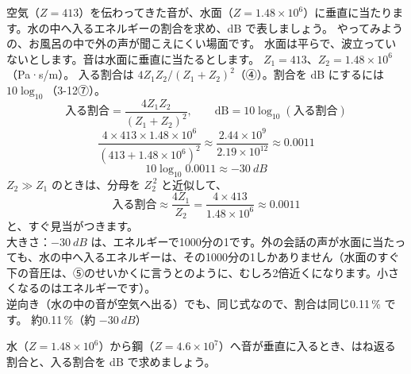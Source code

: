 \label{ph:波-7:ex5}
\begin{phreidai}[空気から水へ入る音]
空気（$Z=413$）を伝わってきた音が、水面（$Z=1.48\times10^6$）に垂直に当たります。水の中へ入るエネルギーの割合を求め、dB で表しましょう。
\phbamen
やってみようの、お風呂の中で外の声が聞こえにくい場面です。
\phmushi
水面は平らで、波立っていないとします。音は水面に垂直に当たるとします。
\phzu
$Z_1=413$、$Z_2=1.48\times10^6$（Pa·s/m）。
\phriyu
入る割合は $4Z_1Z_2/(Z_1+Z_2)^2$（④）。割合を dB にするには $10\log_{10}$（3-12⑦）。
\phtateru
\[\text{入る割合}=\frac{4Z_1Z_2}{(Z_1+Z_2)^2},\qquad\text{dB}=10\log_{10}(\text{入る割合})\]
\phtoku
\[\frac{4\times413\times1.48\times10^6}{(413+1.48\times10^6)^2}\approx\frac{2.44\times10^9}{2.19\times10^{12}}\approx0.0011\]
\[10\log_{10}0.0011\approx\qty{-30}{dB}\]
\phtashikame
$Z_2\gg Z_1$ のときは、分母を $Z_2^{\,2}$ と近似して、
\[\text{入る割合}\approx\frac{4Z_1}{Z_2}=\frac{4\times413}{1.48\times10^6}\approx0.0011\]
と、すぐ見当がつきます。\\
大きさ：$-\qty{30}{dB}$ は、エネルギーで1000分の1です。外の会話の声が水面に当たっても、水の中へ入るエネルギーは、その1000分の1しかありません（水面のすぐ下の音圧は、⑤のせいかくに言うとのように、むしろ2倍近くになります。小さくなるのはエネルギーです）。\\
逆向き（水の中の音が空気へ出る）でも、同じ式なので、割合は同じ0.11\,\% です。
\kotae 約0.11\,\%（約 $\qty{-30}{dB}$）
\end{phreidai}
\begin{jibun}
水（$Z=1.48\times10^6$）から鋼（$Z=4.6\times10^7$）へ音が垂直に入るとき、はね返る割合と、入る割合を dB で求めましょう。
\end{jibun}

